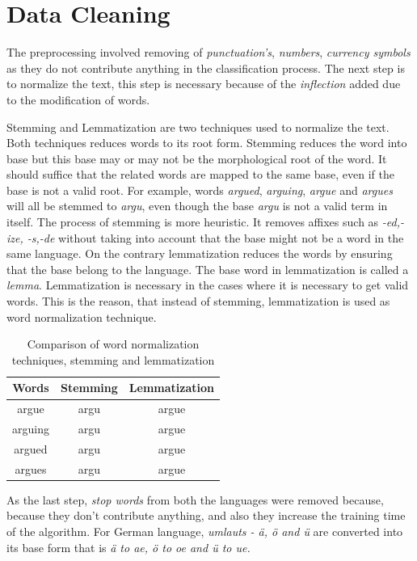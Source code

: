 \section{Data Cleaning}
The preprocessing involved removing of \textit{punctuation's}, \textit{numbers}, \textit{currency symbols} as they do not contribute anything in the classification process. The next step is to normalize the text, this step is necessary because of the \textit{inflection} added due to the modification of words.

Stemming and Lemmatization are two techniques used to normalize the text. Both techniques reduces words to its root form. Stemming reduces the word into base but this base may or may not be the morphological root of the word. It should suffice that the related words are mapped to the same base, even if the base is not a valid root. For example, words \textit{argued}, \textit{arguing}, \textit{argue} and \textit{argues} will all be stemmed to \textit{argu}, even though the base \textit{argu} is not a valid term in itself. The process of stemming is more heuristic. It removes affixes such as \textit{-ed,-ize, -s,-de} without taking into account that the base might not be a word in the same language. On the contrary lemmatization reduces the words by ensuring that the base belong to the language. The base word in lemmatization is called a \textit{lemma}. Lemmatization is necessary in the cases where it is necessary to get valid words. This is the reason, that instead of stemming, lemmatization is used as word normalization technique. 

\begin{table}[!ht]
\centering
\begin{tabular}{ccc}
\hline
\textbf{Words} & \textbf{Stemming} & \textbf{Lemmatization} \\ \hline
argue & argu & argue \\ 
arguing & argu & argue \\ 
argued & argu & argue \\ 
argues & argu & argue \\ \hline
\end{tabular}
\captionsetup{justification=centering,margin=2cm}
\caption{Comparison of word normalization techniques, stemming and lemmatization}
\label{table:StemVSLemma}
\end{table}

As the last step, \textit{stop words} from both the languages were removed because, because they don't contribute anything, and also they increase the training time of the algorithm. For German language, \textit{umlauts - ä, ö and ü} are converted into its base form that is \textit{ä to ae, ö to oe and ü to ue.}

